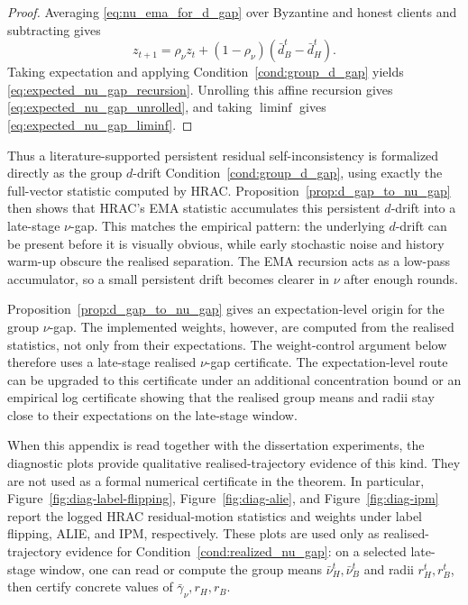 \begin{proof}
Averaging \eqref{eq:nu_ema_for_d_gap} over Byzantine and honest clients and
subtracting gives
\[
    z_{t+1}
    =
    \rho_\nu z_t
    +
    (1-\rho_\nu)(\bar d_B^t-\bar d_H^t).
\]
Taking expectation and applying
Condition~\ref{cond:group_d_gap} yields
\eqref{eq:expected_nu_gap_recursion}. Unrolling this affine recursion gives
\eqref{eq:expected_nu_gap_unrolled}, and taking \(\liminf\) gives
\eqref{eq:expected_nu_gap_liminf}.
\end{proof}

Thus a literature-supported persistent residual self-inconsistency is
formalized directly as the group \(d\)-drift
Condition~\ref{cond:group_d_gap}, using exactly the full-vector statistic
computed by HRAC. Proposition~\ref{prop:d_gap_to_nu_gap} then shows that
HRAC's EMA statistic accumulates this persistent \(d\)-drift into a late-stage
\(\nu\)-gap. This matches the empirical pattern: the underlying \(d\)-drift can
be present before it is visually obvious, while early stochastic noise and
history warm-up obscure the realised separation. The EMA recursion acts as a
low-pass accumulator, so a small persistent drift becomes clearer in \(\nu\)
after enough rounds.

\begin{remark}
\label{rem:expected_d_gap_vs_pathwise_nu}
Proposition~\ref{prop:d_gap_to_nu_gap} gives an expectation-level origin for
the group \(\nu\)-gap. The implemented weights, however, are computed from the
realised statistics, not only from their expectations. The weight-control
argument below therefore uses a late-stage realised \(\nu\)-gap certificate.
The expectation-level route can be upgraded to this certificate under an
additional concentration bound or an empirical log certificate showing that the
realised group means and radii stay close to their expectations on the
late-stage window.

When this appendix is read together with the dissertation experiments, the
diagnostic plots provide qualitative realised-trajectory evidence of this kind.
They are not used as a formal numerical certificate in the theorem. In
particular, Figure~\ref{fig:diag-label-flipping},
Figure~\ref{fig:diag-alie}, and Figure~\ref{fig:diag-ipm} report the logged
HRAC residual-motion statistics and weights under label flipping, ALIE, and
IPM, respectively. These plots are used only as realised-trajectory evidence for
Condition~\ref{cond:realized_nu_gap}: on a selected late-stage window, one can
read or compute the group means \(\bar\nu_H^t,\bar\nu_B^t\) and radii
\(r_H^t,r_B^t\), then certify concrete values of
\(\bar\gamma_\nu,r_H,r_B\).
\end{remark}

